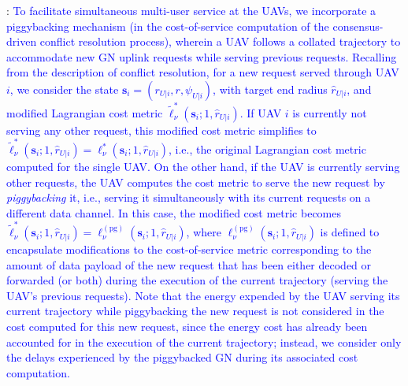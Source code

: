 \documentclass[12pt, draftcls, onecolumn]{IEEEtran}
\theoremstyle{plain}
\theoremstyle{definition}
\theoremstyle{remark}
\newcommand\hlt[1]{\textcolor{blue}{#1}}
\begin{document}
\label{pb_label}
\noindent{\hlt{\textbf{Piggybacking}}}: \hlt{To facilitate simultaneous multi-user service at the UAVs, we incorporate a piggybacking mechanism (in the cost-of-service computation of the consensus-driven conflict resolution process), wherein a UAV follows a collated trajectory to accommodate new GN uplink requests while serving previous requests. Recalling from the description of conflict resolution, for a new request served through UAV $i$, we consider the state $\mathbf s_i = \left( r_{U|i}, r, \psi_{U|i} \right)$, with target end radius $\hat r_{U|i}$, and modified Lagrangian cost metric $\tilde{\ell}_{\nu}^{*} (\mathbf s_i; 1, \hat r_{U|i} )$. If UAV $i$ is currently not serving any other request, this modified cost metric simplifies to $\tilde{\ell}_{\nu}^* (\mathbf s_i; 1, \hat r_{U|i}) {=} \ell_{\nu}^* (\mathbf s_i; 1, \hat r_{U|i})$, i.e., the original Lagrangian cost metric computed for the single UAV. On the other hand, if the UAV is currently serving other requests, the UAV computes the cost metric to serve the new request by \emph{piggybacking} it, i.e., serving it simultaneously with its current requests on a different data channel. In this case, the modified cost metric becomes $\tilde{\ell}_{\nu}^* (\mathbf s_i ; 1, \hat r_{U|i} ) {=} \ell_{\nu}^{(\mathrm{pg})} (\mathbf s_i; 1, \hat r_{U|i})$, where $\ell_{\nu}^{(\mathrm{pg})} (\mathbf s_i; 1, \hat r_{U|i})$ is defined to encapsulate modifications to the cost-of-service metric corresponding to the amount of data payload of the new request that has been either decoded or forwarded (or both) during the execution of the current trajectory (serving the UAV's previous requests). Note that the energy expended by the UAV serving its current trajectory while piggybacking the new request is not considered in the cost computed for this new request, since the energy cost has already been accounted for in the execution of the current trajectory; instead, we consider only the delays experienced by the piggybacked GN during its associated cost computation.}
\vspace{-4mm}
\end{document}
